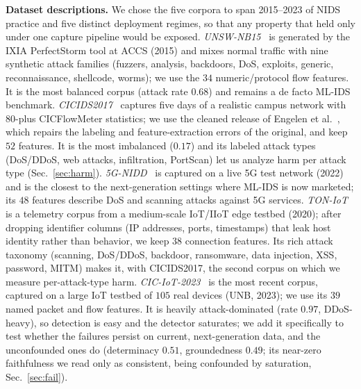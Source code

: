 \documentclass[conference]{IEEEtran}
\begin{document}
\smallskip
\noindent\textbf{Dataset descriptions.} We chose the five corpora to span 2015--2023 of NIDS
practice and five distinct deployment regimes, so that any property that held only under one
capture pipeline would be exposed.
\emph{UNSW-NB15}~\cite{unsw2015} is generated by the IXIA PerfectStorm tool at ACCS (2015) and
mixes normal traffic with nine synthetic attack families (fuzzers, analysis, backdoors, DoS,
exploits, generic, reconnaissance, shellcode, worms); we use the $34$ numeric/protocol flow
features. It is the most balanced corpus (attack rate $0.68$) and remains a de facto ML-IDS
benchmark.
\emph{CICIDS2017}~\cite{cicids2017} captures five days of a realistic campus network with $80$-plus
CICFlowMeter statistics; we use the cleaned release of Engelen et al.~\cite{engelen2021}, which
repairs the labeling and feature-extraction errors of the original, and keep $52$ features. It is
the most imbalanced ($0.17$) and its labeled attack types (DoS/DDoS, web attacks, infiltration,
PortScan) let us analyze harm per attack type (Sec.~\ref{sec:harm}).
\emph{5G-NIDD}~\cite{g5nidd} is captured on a live 5G test network (2022) and is the closest to
the next-generation settings where ML-IDS is now marketed; its $48$ features describe DoS and
scanning attacks against 5G services.
\emph{TON-IoT}~\cite{toniot2020} is a telemetry corpus from a medium-scale IoT/IIoT edge testbed
(2020); after dropping identifier columns (IP addresses, ports, timestamps) that leak host
identity rather than behavior, we keep $38$ connection features. Its rich attack taxonomy
(scanning, DoS/DDoS, backdoor, ransomware, data injection, XSS, password, MITM) makes it, with
CICIDS2017, the second corpus on which we measure per-attack-type harm.
\emph{CIC-IoT-2023}~\cite{ciciot2023} is the most recent corpus, captured on a large IoT testbed of
$105$ real devices (UNB, 2023); we use its $39$ named packet and flow features. It is heavily
attack-dominated (rate $0.97$, DDoS-heavy), so detection is easy and the detector saturates; we add
it specifically to test whether the failures persist on current, next-generation data, and the
unconfounded ones do (determinacy $0.51$, groundedness $0.49$; its near-zero faithfulness we read
only as consistent, being confounded by saturation, Sec.~\ref{sec:fail}).
\end{document}
